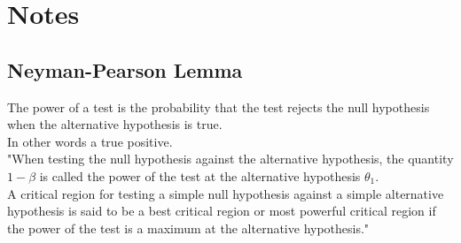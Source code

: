 \documentclass[answers,12pt,addpoints]{exam}
\begin{document}
\section*{Notes}
\subsection{Neyman-Pearson Lemma}
\begin{definition}
    The power of a test is the probability that the test rejects the null hypothesis when the alternative hypothesis is true.\\
    In other words a true positive.\\
    "When testing the null hypothesis against the alternative hypothesis, the quantity $1 - \beta$ is called the power of the test at the alternative hypothesis $\theta_1$. \\
    A critical region for testing a simple null hypothesis against a simple alternative hypothesis is said to be a best critical region or most powerful critical region if the power of the test is a maximum at the alternative hypothesis."
\end{definition}
\end{document}
